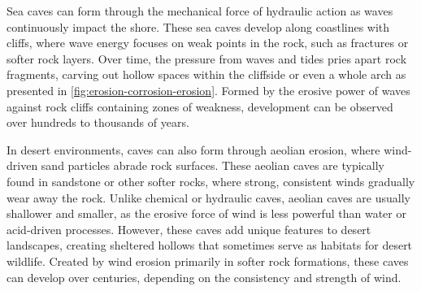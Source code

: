 Sea caves can form through the mechanical force of hydraulic action as waves continuously impact the shore. These sea caves develop along coastlines with cliffs, where wave energy focuses on weak points in the rock, such as fractures or softer rock layers. Over time, the pressure from waves and tides pries apart rock fragments, carving out hollow spaces within the cliffside or even a whole arch as presented in \cref{fig:erosion-corrosion-erosion}. Formed by the erosive power of waves against rock cliffs containing zones of weakness, development can be observed over hundreds to thousands of years.

In desert environments, caves can also form through aeolian erosion, where wind-driven sand particles abrade rock surfaces. These aeolian caves are typically found in sandstone or other softer rocks, where strong, consistent winds gradually wear away the rock. Unlike chemical or hydraulic caves, aeolian caves are usually shallower and smaller, as the erosive force of wind is less powerful than water or acid-driven processes. However, these caves add unique features to desert landscapes, creating sheltered hollows that sometimes serve as habitats for desert wildlife. Created by wind erosion primarily in softer rock formations, these caves can develop over centuries, depending on the consistency and strength of wind.

{}


